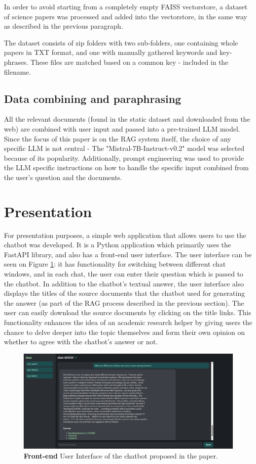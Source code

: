 \documentclass[fleqn,moreauthors,10pt]{ds_report}
\begin{document}
In order to avoid starting from a completely empty FAISS vectorstore, a dataset of science papers \cite{rncamposgithub} was processed and added into the vectorstore, in the same way as described in the previous paragraph.

The dataset consists of zip folders with two sub-folders, one containing whole papers in TXT format, and one with manually gathered keywords and key-phrases. These files are matched based on a common key - included in the filename.

\subsection*{Data combining and paraphrasing}

All the relevant documents (found in the static dataset and downloaded from the web) are combined with user input and passed into a pre-trained LLM model. Since the focus of this paper is on the RAG system itself, the choice of any specific LLM is not central - The "Mistral-7B-Instruct-v0.2" model was selected because of its popularity. Additionally, prompt engineering was used to provide the LLM specific instructions on how to handle the specific input combined from the user's question and the documents.

\section*{Presentation}

For presentation purposes, a simple web application that allows users to use the chatbot was developed. It is a Python application which primarily uses the FastAPI library, and also has a front-end user interface. The user interface can be seen on Figure \ref{fig:frontend}: it has functionality for switching between different chat windows, and in each chat, the user can enter their question which is passed to the chatbot. In addition to the chatbot's textual answer, the user interface also displays the titles of the source documents that the chatbot used for generating the answer (as part of the RAG process described in the previous section). The user can easily download the source documents by clicking on the title links. This functionality enhances the idea of an academic research helper by giving users the chance to delve deeper into the topic themselves and form their own opinion on whether to agree with the chatbot's answer or not.

\begin{figure}[ht]\centering 
	\includegraphics[width=0.7\linewidth]{images/frontend.PNG}
	\caption{\textbf{Front-end} User Interface of the chatbot proposed in the paper.}
	\label{fig:frontend}
\end{figure}
\end{document}
